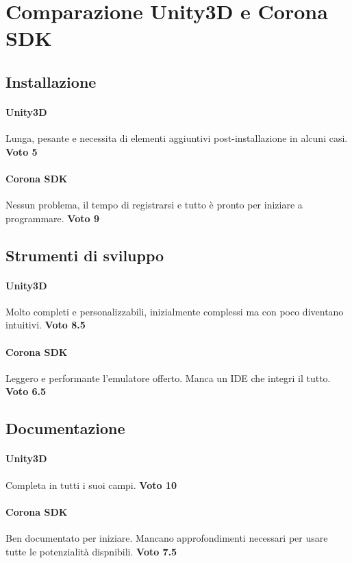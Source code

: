 
\newpage

\section{Comparazione Unity3D e Corona SDK}

	\subsection*{Installazione}
		\paragraph{Unity3D} Lunga, pesante e necessita di elementi aggiuntivi post-installazione in alcuni casi. \textbf{Voto 5}
		\paragraph{Corona SDK} Nessun problema, il tempo di registrarsi e tutto è pronto per iniziare a programmare. \textbf{Voto 9}
		
	\subsection*{Strumenti di sviluppo}
		\paragraph{Unity3D} Molto completi e personalizzabili, inizialmente complessi ma con poco diventano intuitivi. \textbf{Voto 8.5}
		\paragraph{Corona SDK} Leggero e performante l'emulatore offerto. Manca un IDE che integri il tutto. \textbf{Voto 6.5}
	
	\subsection*{Documentazione}
		\paragraph{Unity3D} Completa in tutti i suoi campi. \textbf{Voto 10}
		
		\paragraph{Corona SDK} Ben documentato per iniziare. Mancano approfondimenti necessari per usare tutte le potenzialità dispnibili. \textbf{Voto 7.5}
	

